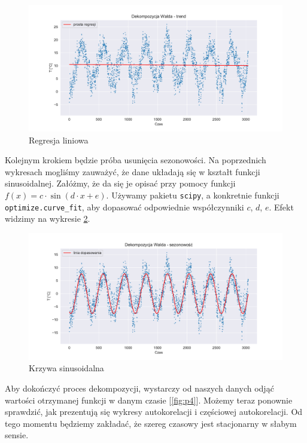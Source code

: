 \documentclass{article}
\theoremstyle{break}
\newcommand{\code}[1]{\colorbox{light-gray}{\texttt{#1}}}
\begin{document}
	\begin{figure}[H]
		\begin{center}
			\includegraphics[scale=0.63]{plot2.pdf}
			\caption{Regresja liniowa}
			\label{fig:p2}
		\end{center}
	\end{figure}
	
	Kolejnym krokiem będzie próba usunięcia sezonowości. Na poprzednich wykresach mogliśmy zauważyć, że dane układają się w kształt funkcji sinusoidalnej. Załóżmy, że da się je opisać przy pomocy funkcji $f(x) = c\cdot\sin(d\cdot x+e)$. Używamy pakietu \code{scipy}, a konkretnie funkcji \code{optimize.curve\_fit}, aby dopasować odpowiednie współczynniki $c$, $d$, $e$. Efekt widzimy na wykresie \ref{fig:p3}.
	
	\begin{figure}[H]
		\begin{center}
			\includegraphics[scale=0.63]{plot3.pdf}
			\caption{Krzywa sinusoidalna}
			\label{fig:p3}
		\end{center}
	\end{figure}
	
	Aby dokończyć proces dekompozycji, wystarczy od naszych danych odjąć wartości otrzymanej funkcji w danym czasie [\ref{fig:p4}]. Możemy teraz ponownie sprawdzić, jak prezentują się wykresy autokorelacji i częściowej autokorelacji. Od tego momentu będziemy zakładać, że szereg czasowy jest stacjonarny w słabym sensie.
	
\end{document}
